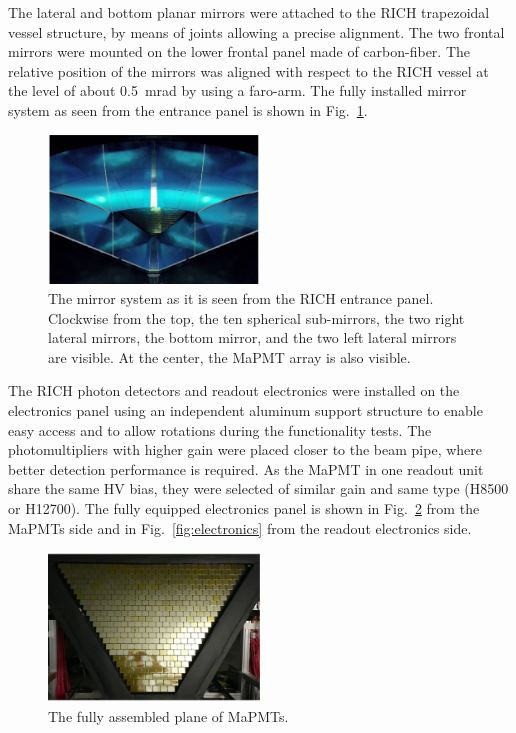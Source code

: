 \documentclass[5p,times,twocolumn]{elsarticle}
\def\MaPMT{MaPMT }
\begin{document}
The lateral and bottom planar mirrors were attached to the RICH trapezoidal vessel structure, by means of
joints allowing a precise alignment. The two frontal mirrors
were mounted on the lower frontal panel made of carbon-fiber. The relative position of the mirrors was
aligned with respect to the RICH vessel at the level of about 0.5~mrad by using a faro-arm. The fully installed
mirror system as seen from the entrance panel is shown in Fig.~\ref{fig:mirrors}.

\begin{figure}
\begin{center}
\includegraphics[width=0.50\textwidth]{mirrors.pdf}
\caption{The mirror system as it is seen from the RICH entrance panel. Clockwise from the top, the ten spherical
  sub-mirrors, the two right lateral mirrors, the bottom mirror, and the two left lateral mirrors are visible. At the
  center, the MaPMT array is also visible.}
\label{fig:mirrors}
\end{center}
\end{figure}

The RICH photon detectors and readout electronics were installed on the electronics panel using an independent
aluminum support structure to enable easy access and to allow rotations during the functionality tests. The photomultipliers
with higher gain were placed closer to the beam pipe, where better detection performance is required. As the \MaPMT in
one readout unit share the same HV bias, they were selected of similar gain and same type (H8500 or H12700).
The fully equipped electronics panel is shown in Fig.~\ref{fig:MaPMTs} from the MaPMTs side and in
Fig.~\ref{fig:electronics} from the readout electronics side.

\begin{figure}
\begin{center}
\includegraphics[width=0.50\textwidth]{MaPMT.pdf}
\caption{The fully assembled plane of MaPMTs.}
\label{fig:MaPMTs}
\end{center}
\end{figure}
\end{document}
